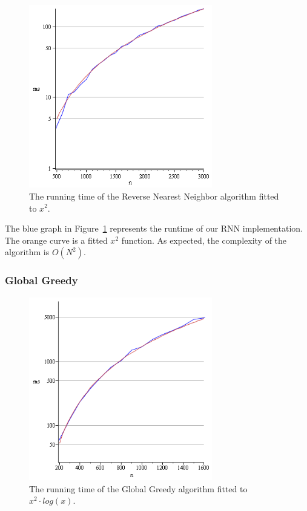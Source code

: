 \documentclass[a4paper,11pt]{article}
\begin{document}
\begin{figure}[ht!]
\centering 
\includegraphics[width=80mm]{RNN_runtime.png}
\caption{The running time of the Reverse Nearest Neighbor algorithm fitted to $x^2$.}
\label{rnn} 
\end{figure}

The blue graph in Figure~\ref{rnn} represents the runtime of our RNN implementation. The orange curve is a fitted $x^2$ function. As expected, the complexity of the algorithm is $O(N^{2})$.

\subsubsection{Global Greedy}

\begin{figure}[ht!]
\centering 
\includegraphics[width=80mm]{GG_runtime.png}
\caption{The running time of the Global Greedy algorithm fitted to $x^2 \cdot log(x)$.}
\label{gg} 
\end{figure}
\end{document}
